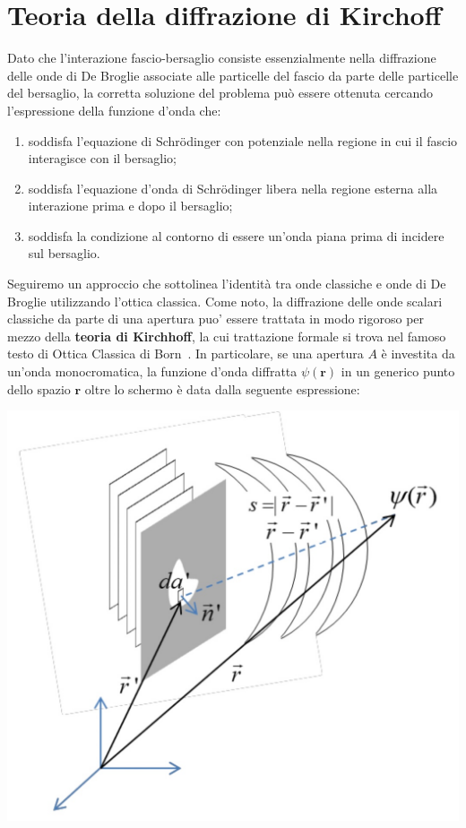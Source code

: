 \section{Teoria della diffrazione di Kirchoff}\label{sec:teoria-della-diffrazione-di-kirchoff}

Dato che l'interazione fascio-bersaglio consiste essenzialmente nella
diffrazione delle onde di De Broglie associate alle particelle del
fascio da parte delle particelle del bersaglio, la corretta soluzione
del problema può essere ottenuta cercando l'espressione della funzione
d'onda che:
\begin{enumerate}
	\tightlist
	\item soddisfa l'equazione di Schrödinger con potenziale nella regione in
	cui il fascio interagisce con il bersaglio;
	\item soddisfa l'equazione d'onda di Schrödinger libera nella regione
	esterna alla interazione prima e dopo il bersaglio;
	\item soddisfa la condizione al contorno di essere un'onda piana prima di
	incidere sul bersaglio.
\end{enumerate}
Seguiremo un approccio che sottolinea l'identità tra onde classiche e onde di De Broglie
utilizzando l'ottica classica.
Come noto, la diffrazione delle onde scalari classiche da parte di una
apertura puo' essere trattata in modo rigoroso per mezzo della
\textbf{teoria di Kirchhoff}, la cui trattazione formale si trova nel famoso testo di Ottica Classica
di Born~\cite{Born2019}.
In particolare, se una apertura $A$ è investita da un'onda
monocromatica, la funzione d'onda diffratta \(\psi(\bm{r})\) in un
generico punto dello spazio \(\bm{r}\) oltre lo schermo è data dalla
seguente espressione:
\begin{marginfigure}
	\includegraphics[width = 1.25 \textwidth, height = 1.25 \textheight]{figs/kirchhoff-diffraction-1}
	\label{fig:kirchhoff-1}
\end{marginfigure}

